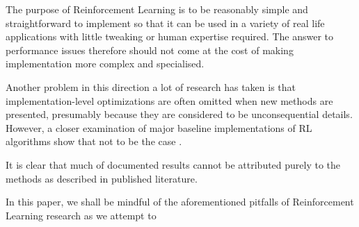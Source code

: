The purpose of Reinforcement Learning is to be reasonably simple and straightforward to implement so that it can be used in a variety of real life applications with little tweaking or human expertise required. The answer to performance issues therefore should not come at the cost of making implementation more complex and specialised.

Another problem in this direction a lot of research has taken is that implementation-level optimizations are often omitted when new methods are presented, presumably because they are considered to be unconsequential details. However, a closer examination of  major baseline implementations of RL algorithms show that not to be the case \cite{henderson2018deep}.

It is clear that much of documented results cannot be attributed purely to the methods as described in published literature.


In this paper, we shall be mindful of the aforementioned pitfalls of Reinforcement Learning research as we attempt to 